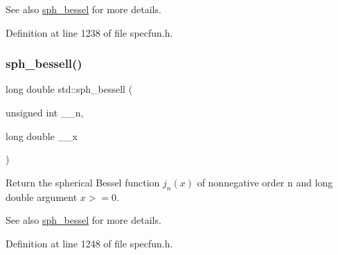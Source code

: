 \begin{DoxySeeAlso}{See also}
\hyperlink{group__tr29124__math__spec__func_ga52331d03089052b53d96c776c62e4997}{sph\+\_\+bessel} for more details. 
\end{DoxySeeAlso}


Definition at line 1238 of file specfun.\+h.

\mbox{\label{group__tr29124__math__spec__func_ga11d72b1af81ce9da3c878a25087ee927}} 
\subsubsection{\texorpdfstring{sph\+\_\+bessell()}{sph\_bessell()}}
{\footnotesize\ttfamily long double std\+::sph\+\_\+bessell (\begin{DoxyParamCaption}\item[{unsigned int}]{\+\_\+\+\_\+n,  }\item[{long double}]{\+\_\+\+\_\+x }\end{DoxyParamCaption})\hspace{0.3cm}{\ttfamily [inline]}}

Return the spherical Bessel function $ j_n(x) $ of nonnegative order n and {\ttfamily long double} argument $ x >= 0 $.

\begin{DoxySeeAlso}{See also}
\hyperlink{group__tr29124__math__spec__func_ga52331d03089052b53d96c776c62e4997}{sph\+\_\+bessel} for more details. 
\end{DoxySeeAlso}


Definition at line 1248 of file specfun.\+h.

\mbox{\label{group__tr29124__math__spec__func_ga5b33a8e403bfa3c6df370e163310d66c}} 
